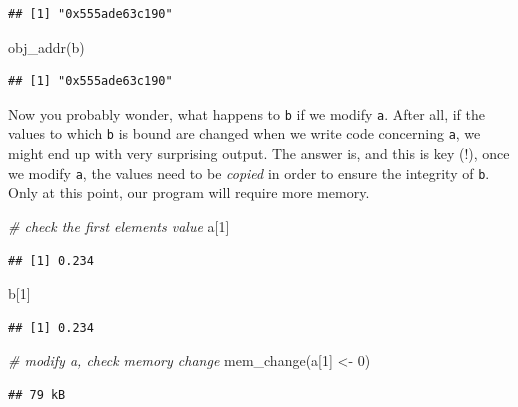 \documentclass[
  12pt,
]{style/krantz}
\newenvironment{Shaded}{\begin{snugshade}}{\end{snugshade}}
\newcommand{\CommentTok}[1]{\textcolor[rgb]{0.56,0.35,0.01}{\textit{#1}}}
\newcommand{\DecValTok}[1]{\textcolor[rgb]{0.00,0.00,0.81}{#1}}
\newcommand{\FunctionTok}[1]{\textcolor[rgb]{0.00,0.00,0.00}{#1}}
\newcommand{\NormalTok}[1]{#1}
\newcommand{\OtherTok}[1]{\textcolor[rgb]{0.56,0.35,0.01}{#1}}
\begin{document}
\begin{verbatim}
## [1] "0x555ade63c190"
\end{verbatim}

\begin{Shaded}
\begin{Highlighting}[]
\FunctionTok{obj\_addr}\NormalTok{(b)}
\end{Highlighting}
\end{Shaded}

\begin{verbatim}
## [1] "0x555ade63c190"
\end{verbatim}

Now you probably wonder, what happens to \texttt{b} if we modify \texttt{a}. After all, if the values to which \texttt{b} is bound are changed when we write code concerning \texttt{a}, we might end up with very surprising output. The answer is, and this is key (!), once we modify \texttt{a}, the values need to be \emph{copied} in order to ensure the integrity of \texttt{b}. Only at this point, our program will require more memory.

\begin{Shaded}
\begin{Highlighting}[]
\CommentTok{\# check the first element\textquotesingle{}s value}
\NormalTok{a[}\DecValTok{1}\NormalTok{]}
\end{Highlighting}
\end{Shaded}

\begin{verbatim}
## [1] 0.234
\end{verbatim}

\begin{Shaded}
\begin{Highlighting}[]
\NormalTok{b[}\DecValTok{1}\NormalTok{]}
\end{Highlighting}
\end{Shaded}

\begin{verbatim}
## [1] 0.234
\end{verbatim}

\begin{Shaded}
\begin{Highlighting}[]
\CommentTok{\# modify a, check memory change}
\FunctionTok{mem\_change}\NormalTok{(a[}\DecValTok{1}\NormalTok{] }\OtherTok{\textless{}{-}} \DecValTok{0}\NormalTok{)}
\end{Highlighting}
\end{Shaded}

\begin{verbatim}
## 79 kB
\end{verbatim}
\end{document}
